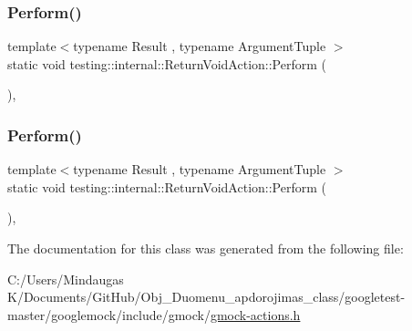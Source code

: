 \mbox{\label{classtesting_1_1internal_1_1_return_void_action_ab9ea50ff501225b7510a623d0f0a405e}} 
\subsubsection{\texorpdfstring{Perform()}{Perform()}\hspace{0.1cm}{\footnotesize\ttfamily [2/3]}}
{\footnotesize\ttfamily template$<$typename Result , typename Argument\+Tuple $>$ \\
static void testing\+::internal\+::\+Return\+Void\+Action\+::\+Perform (\begin{DoxyParamCaption}\item[{const Argument\+Tuple \&}]{ }\end{DoxyParamCaption})\hspace{0.3cm}{\ttfamily [inline]}, {\ttfamily [static]}}

\mbox{\label{classtesting_1_1internal_1_1_return_void_action_ab9ea50ff501225b7510a623d0f0a405e}} 
\subsubsection{\texorpdfstring{Perform()}{Perform()}\hspace{0.1cm}{\footnotesize\ttfamily [3/3]}}
{\footnotesize\ttfamily template$<$typename Result , typename Argument\+Tuple $>$ \\
static void testing\+::internal\+::\+Return\+Void\+Action\+::\+Perform (\begin{DoxyParamCaption}\item[{const Argument\+Tuple \&}]{ }\end{DoxyParamCaption})\hspace{0.3cm}{\ttfamily [inline]}, {\ttfamily [static]}}



The documentation for this class was generated from the following file\+:\begin{DoxyCompactItemize}
\item 
C\+:/\+Users/\+Mindaugas K/\+Documents/\+Git\+Hub/\+Obj\+\_\+\+Duomenu\+\_\+apdorojimas\+\_\+class/googletest-\/master/googlemock/include/gmock/\mbox{\hyperlink{googletest-master_2googlemock_2include_2gmock_2gmock-actions_8h}{gmock-\/actions.\+h}}\end{DoxyCompactItemize}
